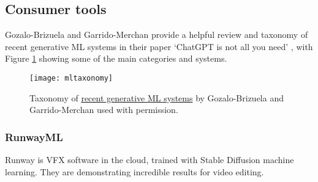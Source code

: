\subsection{Consumer tools}
Gozalo-Brizuela and Garrido-Merchan provide a helpful review and taxonomy of recent generative ML systems in their paper `ChatGPT is not all you need' \cite{gozalo2023chatgpt}, with Figure \ref{fig:MLtaxonomy} showing some of the main categories and systems. 

\begin{figure}
  \centering
    \texttt{[image: mltaxonomy]}
  \caption{Taxonomy of \href{https://arxiv.org/abs/2301.04655}{recent generative ML systems} by Gozalo-Brizuela and Garrido-Merchan used with permission.}
  \label{fig:MLtaxonomy}
\end{figure}

\begin{comment}
-Text-to-Image
DALL-E2
Stable diffusion
Muse
Imagen
-Text-to-3D
dreamfusion
magic3d
-image-to-text
Flamingo
VisualGPT
-Text-to-video
Phenaki
Soundify
-Text-to-code
Codex
Alphacode
-Text-to-Audio
AudioLM
Whisper
Jukebox
-Text-To-Text
ChatGPT3
PEER
LaMDA
Speech From Brain
-Text-to-science
Galactica
Minerva
-Other models
Alphatensor
GATO
Human motion diffusion model
\end{comment}

\subsubsection{RunwayML}
Runway is VFX software in the cloud, trained with Stable Diffusion machine learning. They are demonstrating incredible results for video editing.
